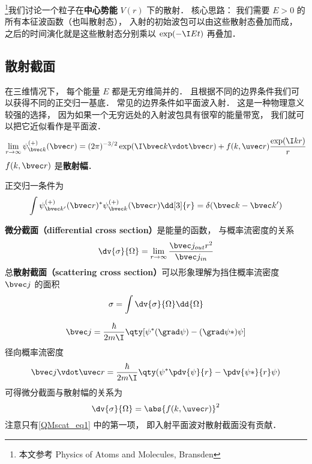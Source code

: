 

\footnote{本文参考 Physics of Atoms and Molecules, Bransden}我们讨论一个粒子在\textbf{中心势能} $V(r)$ 下的散射． 核心思路： 我们需要 $E > 0$ 的所有本征波函数（也叫散射态）， 入射的初始波包可以由这些散射态叠加而成， 之后的时间演化就是这些散射态分别乘以 $\exp(-\I E t)$ 再叠加．

\subsection{散射截面}
在三维情况下， 每个能量 $E$ 都是无穷维简并的． 且根据不同的边界条件我们可以获得不同的正交归一基底． 常见的边界条件如平面波入射． 这是一种物理意义较强的选择， 因为如果一个无穷远处的入射波包具有很窄的能量带宽， 我们就可以把它近似看作是平面波．
\begin{equation}\label{QMscat_eq1}
\lim_{r \to \infty} \psi_{\bvec k}^{(+)}(\bvec r) = (2\pi)^{-3/2} \exp(\I \bvec k \vdot \bvec r) + f(k, \uvec r) \frac{\exp(\I k r)}{r}
\end{equation}
$f(k, \bvec r)$ 是\textbf{散射幅}．

正交归一条件为
\begin{equation}
\int \psi_{\bvec k'}^{(+)}(\bvec r)^* \psi_{\bvec k}^{(+)}(\bvec r) \dd[3]{r} = \delta(\bvec k - \bvec k')
\end{equation}


\textbf{微分截面（differential cross section）}是能量的函数， 与概率流密度的关系
\begin{equation}
\dv{\sigma}{\Omega} = \lim_{r\to\infty}\frac{\bvec j_{out} r^2}{\bvec j_{in}}
\end{equation}
总\textbf{散射截面（scattering cross section）}可以形象理解为挡住概率流密度 $\bvec j$ 的面积
\begin{equation}
\sigma = \int\dv{\sigma}{\Omega} \dd{\Omega}
\end{equation}

\begin{equation}
\bvec j = \frac{\hbar}{2m\I}\qty[\psi^*(\grad \psi) - (\grad \psi*)\psi]
\end{equation}
径向概率流密度
\begin{equation}
\bvec j \vdot \uvec r = \frac{\hbar}{2m\I} \qty(\psi^*\pdv{\psi}{r} - \pdv{\psi*}{r} \psi)
\end{equation}
可得微分截面与散射幅的关系为
\begin{equation}
\dv{\sigma}{\Omega} = \abs{f(k, \uvec r)}^2
\end{equation}
注意只有\autoref{QMscat_eq1} 中的第一项， 即入射平面波对散射截面没有贡献．

